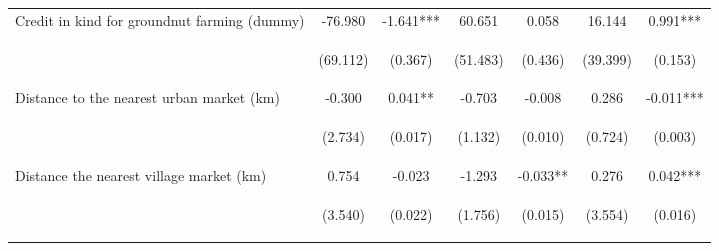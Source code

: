 \begin{center}
\begin{tabular}{lcccccc}
Credit in kind for groundnut farming (dummy) & -76.980 & -1.641*** & 60.651 & 0.058 & 16.144 & 0.991*** \\
\vspace{4pt} & \begin{footnotesize}(69.112)\end{footnotesize} & \begin{footnotesize}(0.367)\end{footnotesize} & \begin{footnotesize}(51.483)\end{footnotesize} & \begin{footnotesize}(0.436)\end{footnotesize} & \begin{footnotesize}(39.399)\end{footnotesize} & \begin{footnotesize}(0.153)\end{footnotesize} \\
Distance to the nearest urban market (km) & -0.300 & 0.041** & -0.703 & -0.008 & 0.286 & -0.011*** \\
\vspace{4pt} & \begin{footnotesize}(2.734)\end{footnotesize} & \begin{footnotesize}(0.017)\end{footnotesize} & \begin{footnotesize}(1.132)\end{footnotesize} & \begin{footnotesize}(0.010)\end{footnotesize} & \begin{footnotesize}(0.724)\end{footnotesize} & \begin{footnotesize}(0.003)\end{footnotesize} \\
Distance the nearest village market (km) & 0.754 & -0.023 & -1.293 & -0.033** & 0.276 & 0.042*** \\
\vspace{4pt} & \begin{footnotesize}(3.540)\end{footnotesize} & \begin{footnotesize}(0.022)\end{footnotesize} & \begin{footnotesize}(1.756)\end{footnotesize} & \begin{footnotesize}(0.015)\end{footnotesize} & \begin{footnotesize}(3.554)\end{footnotesize} & \begin{footnotesize}(0.016)\end{footnotesize} \\

\end{tabular}
\end{center}
